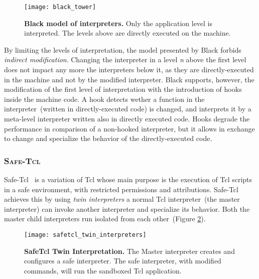 \begin{figure}[ht]
\begin{center}
\texttt{[image: black\_tower]}
\caption{\textbf{Black model of interpreters.} Only the application level is interpreted. The levels above are directly executed on the machine.\label{fig:black_tower}
 }
\end{center}
\end{figure}

By limiting the levels of interpretation, the model presented by Black forbids \emph{indirect modification}. Changing the interpreter in a level \emph{n} above the first level does not impact any more the interpreters below it, as they are directly-executed in the machine and not by the modified interpreter. Black supports, however, the modification of the first level of interpretation with the introduction of hooks inside the machine code. A hook detects wether a function in the interpreter~(written in directly-executed code) is changed, and interprets it by a meta-level interpreter written also in directly executed code. Hooks degrade the performance in comparison of a non-hooked interpreter, but it allows in exchange to change and specialize the behavior of the directly-executed code.

\subsubsection*{\textsc{Safe-Tcl}}
Safe-Tcl~\cite{Levy97a, Bore94a} is a variation of Tcl whose main purpose is the execution of Tcl scripts in a safe environment, with restricted permissions and attributions. Safe-Tcl achieves this by using \emph{twin interpreters} \ie a normal Tcl interpreter~(the master interpreter) can invoke another interpreter and specialize its behavior. Both the master child interpreters run isolated from each other~(Figure \ref{fig:safetcl_twin_interpreters}).

\begin{figure}[ht]
\begin{center}
\texttt{[image: safetcl\_twin\_interpreters]}
\caption{\textbf{SafeTcl Twin Interpretation.} The Master interpreter creates and configures a safe interpreter. The safe interpreter, with modified commands, will run the sandboxed Tcl application.\label{fig:safetcl_twin_interpreters}
 }
\end{center}
\end{figure}

